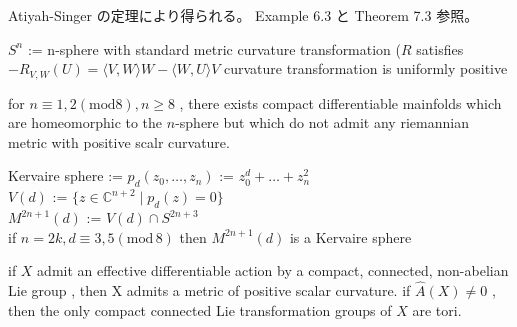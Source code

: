 \begin{Proof}
\itemprof
  Atiyah-Singer の定理により得られる。
  Example 6.3 と Theorem 7.3 参照。
\end{Proof}

\begin{Theorem}
\itemwhen
  \Let \(S^n\) := n-sphere with standard metric
\itemprop
  \Then curvature transformation (\(R\) satisfies \(- R_{V,W}(U) = \langle V , W \rangle W - \langle W , U \rangle V\)
\itemprop
  \Then curvature transformation is uniformly positive
\end{Theorem}

\begin{Theorem}
\itemprop
  for \(n \equiv 1 , 2 (\text{mod} 8) , n \geq 8\) , there exists compact differentiable mainfolds which are homeomorphic to the \(n\)-sphere but which do not admit any riemannian metric with positive scalr curvature.
\end{Theorem}

\begin{Proof}
\itemprof
  \ADMIT
\end{Proof}

\begin{Theorem}
\itemdefi
  \Let Kervaire sphere := 
\itemdefi
  \Let \(p_d(z_0 , \ldots , z_n)\) := \(z_0^d + \ldots + z_n^2\) \\
  \Let \(V(d)\) := \(\{z \in \mathbb{C}^{n+2} \mid p_d(z) = 0\}\) \\
  \Let \(M^{2n+1}(d)\) := \(V(d) \cap S^{2n+3}\) \\
\itemprop
  if \(n = 2k , d \equiv 3,5 (\text{mod} \, 8)\) then \(M^{2n+1}(d)\) is a Kervaire sphere
\end{Theorem}

\begin{Proof}
\itemprof
  \ADMIT
\end{Proof}

\begin{Theorem}
\itemprop
  if \(X\) admit an effective differentiable action by a compact, connected, non-abelian Lie group , then X admits a metric of positive scalar curvature.
\itemprop 
  if \(\hat{A}(X) \not = 0\) , then the only compact connected Lie transformation groups of \(X\) are tori.
\end{Theorem}

\begin{Proof}
\itemprof
  \ADMIT
\end{Proof}

